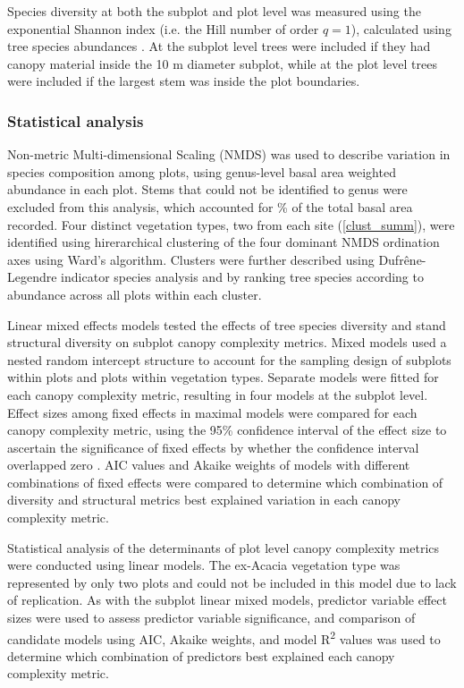 \documentclass[11pt,a4paper]{article}
\begin{document}
Species diversity at both the subplot and plot level was measured using the exponential Shannon index (i.e. the Hill number of order $q=1$), calculated using tree species abundances \citep{Jost2006}. At the subplot level trees were included if they had canopy material inside the 10 m diameter subplot, while at the plot level trees were included if the largest stem was inside the plot boundaries.

\subsubsection{Statistical analysis}

Non-metric Multi-dimensional Scaling (NMDS) was used to describe variation in species composition among plots, using genus-level basal area weighted abundance in each plot. Stems that could not be identified to genus were excluded from this analysis, which accounted for \perIndet{}\% of the total basal area recorded. Four distinct vegetation types, two from each site (\autoref{clust_summ}), were identified using hirerarchical clustering of the four dominant NMDS ordination axes using Ward's algorithm. Clusters were further described using Dufr\^{e}ne-Legendre indicator species analysis and by ranking tree species according to abundance across all plots within each cluster. 

Linear mixed effects models tested the effects of tree species diversity and stand structural diversity on subplot canopy complexity metrics. Mixed models used a nested random intercept structure to account for the sampling design of subplots within plots and plots within vegetation types. Separate models were fitted for each canopy complexity metric, resulting in four models at the subplot level. Effect sizes among fixed effects in maximal models were compared for each canopy complexity metric, using the 95\% confidence interval of the effect size to ascertain the significance of fixed effects by whether the confidence interval overlapped zero \citep{Nakagawa2007}. AIC values and Akaike weights of models with different combinations of fixed effects were compared to determine which combination of diversity and structural metrics best explained variation in each canopy complexity metric. 

Statistical analysis of the determinants of plot level canopy complexity metrics were conducted using linear models. The ex-Acacia vegetation type was represented by only two plots and could not be included in this model due to lack of replication. As with the subplot linear mixed models, predictor variable effect sizes were used to assess predictor variable significance, and comparison of candidate models using AIC, Akaike weights, and model R\textsuperscript{2} values was used to determine which combination of predictors best explained each canopy complexity metric.
\end{document}
